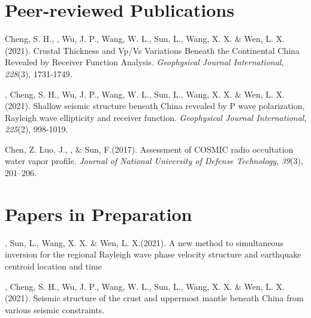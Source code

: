 \newcommand{\Revision}{\textit{under revision}}
\newcommand{\CS}{*} %
\newcommand{\CF}{\textsuperscript{\#}} %


\section*{Peer-reviewed Publications}

\begin{etaremune}
\item
    Cheng, S. H., \Xiao, Wu, J. P., Wang, W. L., Sun, L., Wang, X. X. \& Wen, L. X.(2021).
    Crustal Thickness and Vp/Vs Variations Beneath the Continental China Revealed by Receiver Function Analysis.
    \textit{Geophysical Journal International}, \textit{228}(3), 1731-1749.
\item
    \Xiao, Cheng, S. H., Wu, J. P., Wang, W. L., Sun, L., Wang, X. X. \& Wen, L. X.(2021).
    Shallow seismic structure beneath China revealed by P wave polarization, Rayleigh wave ellipticity and receiver function.
    \textit{Geophysical Journal International}, \textit{225}(2), 998-1019.
\item
    Chen, Z. Luo, J.,  \Xiao, \& Sun, F.(2017).
    Assessment of COSMIC radio occultation water vapor profile.
    \textit{Journal of National University of Defense Technology}, \textit{39}(3), 201--206.
\end{etaremune}


\section*{Papers in Preparation}
\begin{etaremune}
\item
    \Xiao, Sun, L., Wang, X. X. \& Wen, L. X.(2021).
    A new method to simultaneous inversion for the regional Rayleigh wave phase velocity structure and earthquake centroid location and time
\item
    \Xiao, Cheng, S. H., Wu, J. P., Wang, W. L., Sun, L., Wang, X. X. \& Wen, L. X.(2021).
    Seismic structure of the crust and uppermost mantle beneath China from various seismic constraints.
\end{etaremune}

